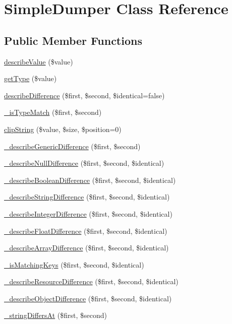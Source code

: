 \hypertarget{class_simple_dumper}{
\section{SimpleDumper Class Reference}
\label{class_simple_dumper}
}
\subsection*{Public Member Functions}
\begin{DoxyCompactItemize}
\item 
\hyperlink{class_simple_dumper_a98625cdd0b0a6c6a79d241c61948d503}{describeValue} (\$value)
\item 
\hyperlink{class_simple_dumper_a9227e45302efff30362ace986e212e0f}{getType} (\$value)
\item 
\hyperlink{class_simple_dumper_a78fae8eec932f81837b42b3a04edaed4}{describeDifference} (\$first, \$second, \$identical=false)
\item 
\hyperlink{class_simple_dumper_a42de5f42d63586d40792e87e7089f76e}{\_\-isTypeMatch} (\$first, \$second)
\item 
\hyperlink{class_simple_dumper_ac86927b4e1d50b38568e384921703abc}{clipString} (\$value, \$size, \$position=0)
\item 
\hyperlink{class_simple_dumper_a34d972570eebff32d2bf3ac5486be532}{\_\-describeGenericDifference} (\$first, \$second)
\item 
\hyperlink{class_simple_dumper_a435904932e367610ff8d534b0c7fead0}{\_\-describeNullDifference} (\$first, \$second, \$identical)
\item 
\hyperlink{class_simple_dumper_a7985db05f6a6efc44fe11dda9af19e8b}{\_\-describeBooleanDifference} (\$first, \$second, \$identical)
\item 
\hyperlink{class_simple_dumper_ae437e663ab617a81ecad026150095bb3}{\_\-describeStringDifference} (\$first, \$second, \$identical)
\item 
\hyperlink{class_simple_dumper_a8c66c59f6d285144cafdc6a98b47beb8}{\_\-describeIntegerDifference} (\$first, \$second, \$identical)
\item 
\hyperlink{class_simple_dumper_a258987baad05d711b2cb6dd62f20ec90}{\_\-describeFloatDifference} (\$first, \$second, \$identical)
\item 
\hyperlink{class_simple_dumper_afd7841060f7d5b0ef8307ec085bdc105}{\_\-describeArrayDifference} (\$first, \$second, \$identical)
\item 
\hyperlink{class_simple_dumper_ac0da3bfc6ffa456da3d5aa360f70aed8}{\_\-isMatchingKeys} (\$first, \$second, \$identical)
\item 
\hyperlink{class_simple_dumper_a5b97a3602c33af778f5e9f0711e42073}{\_\-describeResourceDifference} (\$first, \$second, \$identical)
\item 
\hyperlink{class_simple_dumper_af8c3d07af65c9ffcf68a0089c98e6b24}{\_\-describeObjectDifference} (\$first, \$second, \$identical)
\item 
\hyperlink{class_simple_dumper_a64f96298601fcbfbf658b607096e8a73}{\_\-stringDiffersAt} (\$first, \$second)
\end{DoxyCompactItemize}
